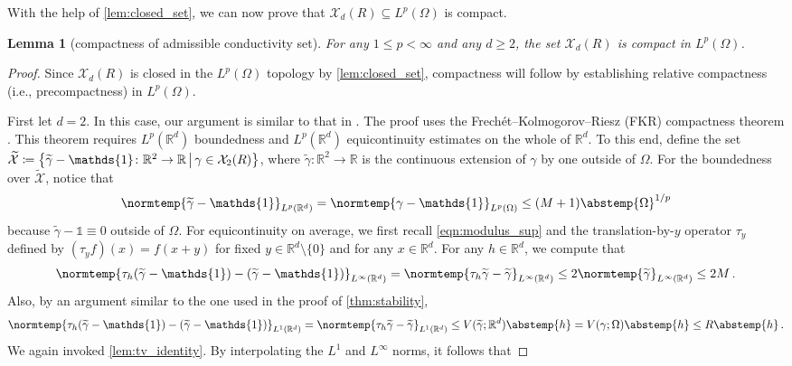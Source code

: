 \documentclass[pdflatex,sn-mathphys-num]{sn-jnl-preprint}
\let\originalleft\left %
\let\originalright\right
\renewcommand{\left}{\mathopen{}\mathclose\bgroup\originalleft}
\renewcommand{\right}{\aftergroup\egroup\originalright}
\newcommand{\R}{\mathbb{R}}
\newcommand{\cX}{\mathcal{X}}
\newcommand{\norm}{\normtemp}
\newcommand{\abs}{\abstemp}
\newcommand{\set}[2]{{\left\{ #1 \,\middle|\, #2 \right\}}}
\newcommand{\defeq}{\coloneqq} %
\newcommand{\onebm}{\mathds{1}} %
\theoremstyle{thmstyleone}%
\newtheorem{lemma}[theorem]{Lemma}%
\theoremstyle{thmstyletwo}%
\theoremstyle{thmstylethree}%
\numberwithin{equation}{section}
\numberwithin{theorem}{section}
\begin{document}
With the help of \cref{lem:closed_set}, we can now prove that $\cX_d(R)\subseteq L^p(\Omega)$ is compact.
\begin{lemma}[compactness of admissible conductivity set]\label{lem:compact_set}
    For any $1\leq p< \infty$ and any $d\geq 2$, the set $\cX_d(R)$ is compact in $L^p(\Omega)$.
\end{lemma}
\begin{proof}
Since $\cX_d(R)$ is closed in the $L^p(\Omega)$ topology by \cref{lem:closed_set}, compactness will follow by establishing relative compactness (i.e., precompactness) in $L^p(\Omega)$. 

First let $d=2$. In this case, our argument is similar to that in \cite[Appendix C]{bhattacharya2023learning}. The proof uses the Frech\'et--Kolmogorov--Riesz (FKR) compactness theorem \cite[Thm.~4.26, Sec.~4.5, p.~111]{brezis2011functional}. This theorem requires $L^p(\R^d)$ boundedness and $L^p(\R^d)$ equicontinuity estimates on the whole of $\R^d$. To this end, define the set $\widetilde{\cX}\defeq \set{\widetilde{\gamma}-\onebm \colon\R^2\to\R}{\gamma\in\cX_2(R)}$, where $\widetilde{\gamma}\colon\R^2\to\R$ is the continuous extension of $\gamma$ by one outside of $\Omega$. For the boundedness over $\widetilde{\cX}$, notice that
\begin{align*}
    \norm{\widetilde{\gamma}-\onebm}_{L^p(\R^d)}=\norm{\gamma-\onebm}_{L^p(\Omega)}\leq  (M+1)\abs{\Omega}^{1/p}
\end{align*}
because $\widetilde{\gamma}-\onebm\equiv 0$ outside of $\Omega$. For equicontinuity on average, we first recall \eqref{eqn:modulus_sup} and the translation-by-$y$ operator $\tau_y$ defined by $(\tau_y f)(x)= f(x+y)$ for fixed $y\in\R^d\setminus\{0\}$ and for any $x\in\R^d$. For any $h\in\R^d$, we compute that
\begin{align*}
    \norm{\tau_h(\widetilde{\gamma}-\onebm) - (\widetilde{\gamma}-\onebm)}_{L^\infty(\R^d)}=\norm{\tau_h\widetilde{\gamma}-\widetilde{\gamma}}_{L^\infty(\R^d)}
    \leq 2\norm{\widetilde{\gamma}}_{L^\infty(\R^d)}
    \leq 2 M\,.
\end{align*}
Also, by an argument similar to the one used in the proof of \cref{thm:stability},
\begin{align*}
    \norm{\tau_h(\widetilde{\gamma}-\onebm) - (\widetilde{\gamma}-\onebm)}_{L^1(\R^d)}=\norm{\tau_h\widetilde{\gamma}-\widetilde{\gamma}}_{L^1(\R^d)}
    \leq V(\widetilde{\gamma};\R^d)\abs{h}
    = V(\gamma;\Omega)\abs{h}\leq R\abs{h}\,.
\end{align*}
We again invoked \cref{lem:tv_identity}. By interpolating the $L^1$ and $L^\infty$ norms, it follows that

\end{proof}
\end{document}
